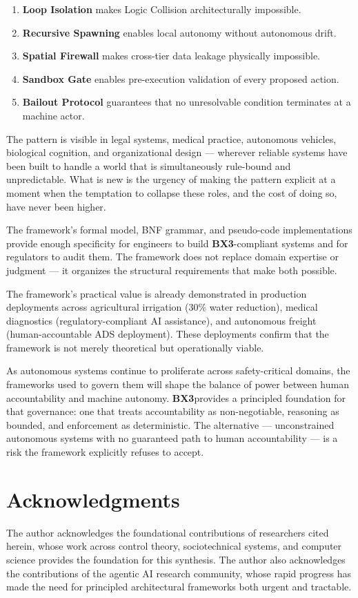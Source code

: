 \documentclass[12pt]{article}
\newcommand{\bxthree}{\textbf{BX3}}
\begin{document}
\begin{enumerate}
\item \textbf{Loop Isolation} makes Logic Collision architecturally impossible.
\item \textbf{Recursive Spawning} enables local autonomy without autonomous drift.
\item \textbf{Spatial Firewall} makes cross-tier data leakage physically impossible.
\item \textbf{Sandbox Gate} enables pre-execution validation of every proposed action.
\item \textbf{Bailout Protocol} guarantees that no unresolvable condition terminates at a machine actor.
\end{enumerate}

The pattern is visible in legal systems, medical practice, autonomous vehicles, biological cognition, and organizational design --- wherever reliable systems have been built to handle a world that is simultaneously rule-bound and unpredictable. What is new is the urgency of making the pattern explicit at a moment when the temptation to collapse these roles, and the cost of doing so, have never been higher.

The framework's formal model, BNF grammar, and pseudo-code implementations provide enough specificity for engineers to build \bxthree-compliant systems and for regulators to audit them. The framework does not replace domain expertise or judgment --- it organizes the structural requirements that make both possible.

The framework's practical value is already demonstrated in production deployments across agricultural irrigation (30\% water reduction), medical diagnostics (regulatory-compliant AI assistance), and autonomous freight (human-accountable ADS deployment). These deployments confirm that the framework is not merely theoretical but operationally viable.

As autonomous systems continue to proliferate across safety-critical domains, the frameworks used to govern them will shape the balance of power between human accountability and machine autonomy. \bxthree provides a principled foundation for that governance: one that treats accountability as non-negotiable, reasoning as bounded, and enforcement as deterministic. The alternative --- unconstrained autonomous systems with no guaranteed path to human accountability --- is a risk the framework explicitly refuses to accept.

\section*{Acknowledgments}
The author acknowledges the foundational contributions of researchers cited herein, whose work across control theory, sociotechnical systems, and computer science provides the foundation for this synthesis. The author also acknowledges the contributions of the agentic AI research community, whose rapid progress has made the need for principled architectural frameworks both urgent and tractable.
\end{document}
